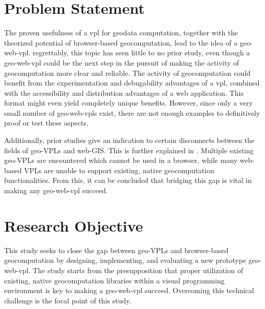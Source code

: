 \section{Problem Statement}

The proven usefulness of a vpl for geodata computation, together with the theorized potential of browser-based geocomputation, lead to the idea of a \ac{geo-web-vpl}. 
regrettably, this topic has seen little to no prior study, even though a \ac{geo-web-vpl} could be the next step in the pursuit of making the activity of geocomputation more clear and reliable.
The activity of geocomputation could benefit from the experimentation and debugability advantages of a \ac{vpl}, combined with the accessibility and distribution advantages of a web application.
This format might even yield completely unique benefits.
However, since only a very small number of geo-web-vpls exist, there are not enough examples to definitively proof or test these aspects. 

Additionally, prior studies give an indication to certain disconnects between the fields of geo-VPLs and web-GIS. 
This is further explained in .
Multiple existing geo-VPLs are encountered which cannot be used in a browser, while  many web-based VPLs are unable to support existing, native geocomputation functionalities. 
From this, it can be concluded that bridging this gap is vital in making any geo-web-vpl succeed. 


\section{Research Objective}

This study seeks to close the gap between geo-VPLs and browser-based geocomputation by designing, implementing, and evaluating a new prototype \ac{geo-web-vpl}.
The study starts from the presupposition that proper utilization of existing, native geocomputation libraries within a visual programming environment is key to making a geo-web-vpl succeed. 
Overcoming this technical challenge is the focal point of this study. 

